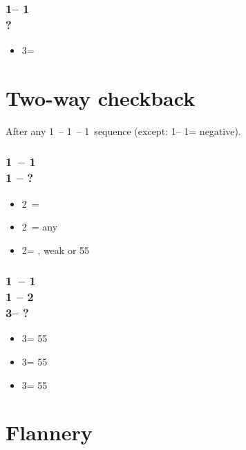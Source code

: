 \documentclass[12pt, a4paper]{report}
\begin{document}
{{        \subsubsection*{1\diams -- 1\spades\\
                        ?}
        \begin{itemize}
            \item 3\hearts = \diams\ \gf
        \end{itemize}
    }

    \section*{\colorbox{blue!30}{Two-way checkback}}
     {

        After any 1\ -- 1\ -- 1\ sequence (except:
        1\clubs -- 1\diams = negative).

        \subsubsection*{1\ -- 1 \\ 1 -- ?}
        \begin{itemize}
            \item 2\clubs\ = \diams
            \item 2\diams\ = any \gf
            \item 2\nt = \clubs, weak or 55
        \end{itemize}

        \subsubsection*{1\ -- 1 \\ 
                        1 -- 2\nt\\
                        3\clubs -- ?}
        \begin{itemize}
            \item 3\diams = 55\diams
            \item 3\hearts = 55\hearts
            \item 3\spades = 55\clubs
        \end{itemize}
    }

    \section*{\colorbox{blue!30}{Flannery}}
     {

}}
\end{document}
